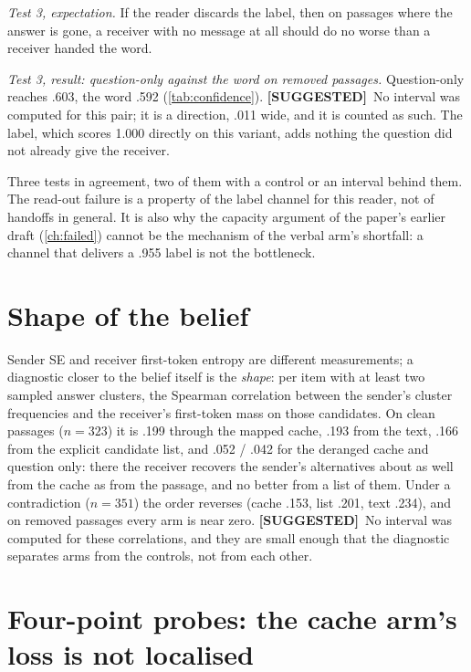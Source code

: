 \documentclass[11pt,a4paper]{report}
\newcommand{\SUGG}{\textcolor{suggc}{\textbf{\scriptsize[SUGGESTED]}}}
\newcommand{\msugg}{\marginnote{\SUGG}}
\begin{document}
\emph{Test 3, expectation.} If the reader discards the label, then on passages where the answer is gone, a receiver with no message at all should do no worse than a receiver handed the word.

\emph{Test 3, result: question-only against the word on removed passages.} Question-only reaches .603, the word .592 (\cref{tab:confidence}). \SUGG\ No interval was computed for this pair; it is a direction, .011 wide, and it is counted as such. The label, which scores 1.000 directly on this variant, adds nothing the question did not already give the receiver.

Three tests in agreement, two of them with a control or an interval behind them. The read-out failure is a property of the label channel for this reader, not of handoffs in general. It is also why the capacity argument of the paper's earlier draft (\cref{ch:failed}) cannot be the mechanism of the verbal arm's shortfall: a channel that delivers a .955 label is not the bottleneck.

\section{Shape of the belief}

\msugg Sender SE and receiver first-token entropy are different measurements; a diagnostic closer to the belief itself is the \emph{shape}: per item with at least two sampled answer clusters, the Spearman correlation between the sender's cluster frequencies and the receiver's first-token mass on those candidates. On clean passages ($n = 323$) it is .199 through the mapped cache, .193 from the text, .166 from the explicit candidate list, and .052 / .042 for the deranged cache and question only: there the receiver recovers the sender's alternatives about as well from the cache as from the passage, and no better from a list of them. Under a contradiction ($n = 351$) the order reverses (cache .153, list .201, text .234), and on removed passages every arm is near zero. \SUGG\ No interval was computed for these correlations, and they are small enough that the diagnostic separates arms from the controls, not from each other.

\section{Four-point probes: the cache arm's loss is not localised}
\end{document}
